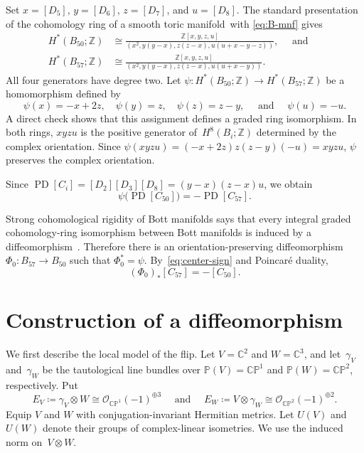 \documentclass[10pt,a4paper]{amsart}
\numberwithin{equation}{section}
\newcommand{\Z}{\mathbb Z}
\newcommand{\C}{\mathbb C}
\renewcommand{\P}{\mathbb P}
\newcommand{\cO}{\mathcal O}
\newcommand{\CP}{\mathbb{CP}}
\newcommand{\wideand}{ \quad \text{ and } \quad }
\DeclareMathOperator{\PD}{PD}
\begin{document}
Set $x=[D_5]$, $y=[D_6]$, $z=[D_7]$, and $u=[D_8]$.
The standard presentation of the cohomology ring of a smooth toric manifold~with \eqref{eq:B-mnf} gives
\begin{align*}
    H^\ast(B_{50};\Z) &\cong \frac{\Z[x,y,z,u]}{(x^2, y(y-x), z(z-x), u(u+x-y-z))}, \wideand\\
    H^\ast(B_{57};\Z) &\cong \frac{\Z[x,y,z,u]}{(x^2, y(y-x), z(z-x), u(u+x-y))}.
\end{align*}
All four generators have degree two.
Let $\psi\colon H^\ast(B_{50};\Z)\to H^\ast(B_{57};\Z)$ be a homomorphism defined by 
$$
    \psi(x)=-x+2z, \quad \psi(y)=z, \quad \psi(z)=z-y, \wideand \psi(u)=-u.
$$
A direct check shows that this assignment defines a graded ring isomorphism.
In both rings, $xyzu$ is the positive generator of~$H^8(B_i;\Z)$ determined by the complex orientation. 
Since $\psi(xyzu)=(-x+2z)z(z-y)(-u)=xyzu$, $\psi$ preserves the complex orientation.

Since $\PD[C_i]=[D_2][D_3][D_8]=(y-x)(z-x)u$, we obtain
\begin{equation}\label{eq:center-sign}
    \psi\bigl(\PD[C_{50}]\bigr) =-\PD[C_{57}].
\end{equation}

Strong cohomological rigidity of Bott manifolds says that every integral graded cohomology-ring isomorphism between Bott manifolds is induced by a diffeomorphism~\cite[Theorem~1.1]{Choi-Hwang-Jang2025}. 
Therefore there is an orientation-preserving diffeomorphism~$\Phi_0\colon B_{57}\to B_{50}$ such that $\Phi_0^*=\psi$.
By~\eqref{eq:center-sign} and Poincar\'e duality, 
\begin{equation}\label{eq:homology-sign} 
    (\Phi_0)_*[C_{57}]=-[C_{50}]. 
\end{equation}


\section{Construction of a diffeomorphism} \label{sec:transport}

We first describe the local model of the flip. 
Let $V=\C^2$ and $W=\C^3$, and let~$\gamma_V$ and~$\gamma_W$ be the tautological line bundles over $\P(V)=\CP^1$ and $\P(W)=\CP^2$, respectively. 
Put
$$
    E_V\coloneq \gamma_V\otimes W \cong \cO_{\CP^1}(-1)^{\oplus3}  \wideand E_W \coloneq V\otimes\gamma_W \cong \cO_{\CP^2}(-1)^{\oplus 2}.
$$
Equip $V$ and $W$ with conjugation-invariant Hermitian metrics.
Let $U(V)$ and~$U(W)$ denote their groups of complex-linear isometries.
We use the induced norm on~$V\otimes W$.
\end{document}
